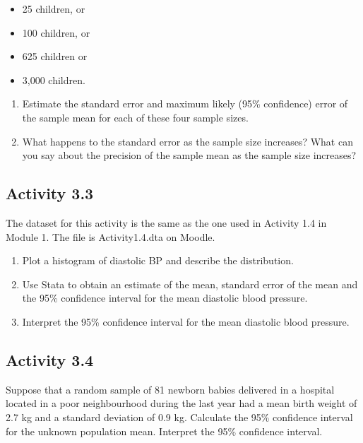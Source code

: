 \documentclass[
]{memoir}
\providecommand{\tightlist}{%
  \setlength{\itemsep}{0pt}\setlength{\parskip}{0pt}}
\begin{document}
\begin{itemize}
\tightlist
\item
  25 children, or
\item
  100 children, or
\item
  625 children or
\item
  3,000 children.
\end{itemize}

\begin{enumerate}
\def\labelenumi{\alph{enumi})}
\tightlist
\item
  Estimate the standard error and maximum likely (95\% confidence) error of the sample mean for each of these four sample sizes.
\item
  What happens to the standard error as the sample size increases? What can you say about the precision of the sample mean as the sample size increases?
\end{enumerate}

\hypertarget{activity-3.3}{%
\subsection*{Activity 3.3}\label{activity-3.3}}

The dataset for this activity is the same as the one used in Activity 1.4 in Module 1. The file is Activity1.4.dta on Moodle.

\begin{enumerate}
\def\labelenumi{\alph{enumi})}
\tightlist
\item
  Plot a histogram of diastolic BP and describe the distribution.
\item
  Use Stata to obtain an estimate of the mean, standard error of the mean and the 95\% confidence interval for the mean diastolic blood pressure.
\item
  Interpret the 95\% confidence interval for the mean diastolic blood pressure.
\end{enumerate}

\hypertarget{activity-3.4}{%
\subsection*{Activity 3.4}\label{activity-3.4}}

Suppose that a random sample of 81 newborn babies delivered in a hospital located in a poor neighbourhood during the last year had a mean birth weight of 2.7 kg and a standard deviation of 0.9 kg. Calculate the 95\% confidence interval for the unknown population mean. Interpret the 95\% confidence interval.
\end{document}
